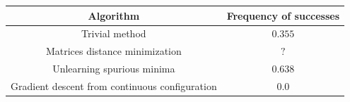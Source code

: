 \begin{tabular}{cc}
\toprule
Algorithm                                      & Frequency of successes \\ \midrule
Trivial method                           & $0.355$                \\
Matrices distance minimization                 & $?$                    \\ 
Unlearning spurious minima                     & $0.638$                    \\
Gradient descent from continuous configuration & $0.0$                    \\
\bottomrule
\end{tabular}
